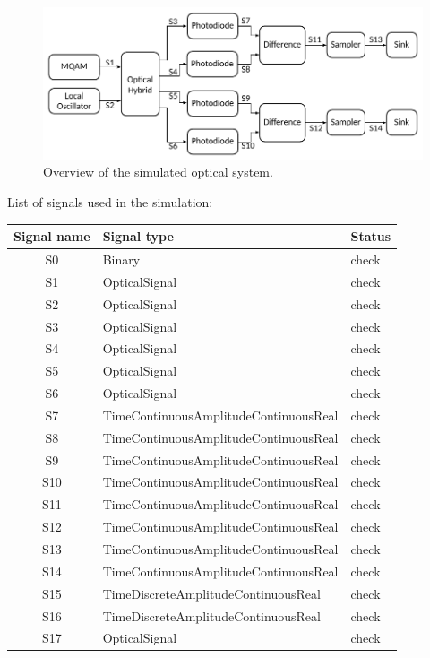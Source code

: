 \begin{figure}[H]
\centering
\includegraphics[width=\linewidth]{./sdf/quantum_noise/figures/scheme_setup.pdf}
\caption{Overview of the simulated optical system.}
\label{fig:setup}
\end{figure}
%
\vspace{1em}
%
List of signals used in the simulation:
\begin{table}[H]
\centering
\begin{tabular}{|c|l|l|}
\hline
\bf{Signal name}	& \bf{Signal type}						& \bf{Status}\\
\hline
S0					& Binary								& check\\
S1					& OpticalSignal							& check\\
S2					& OpticalSignal							& check\\
S3					& OpticalSignal							& check\\
S4					& OpticalSignal							& check\\
S5					& OpticalSignal							& check\\
S6					& OpticalSignal							& check\\
S7					& TimeContinuousAmplitudeContinuousReal	& check\\
S8					& TimeContinuousAmplitudeContinuousReal	& check\\
S9					& TimeContinuousAmplitudeContinuousReal	& check\\
S10					& TimeContinuousAmplitudeContinuousReal	& check\\
S11					& TimeContinuousAmplitudeContinuousReal	& check\\
S12					& TimeContinuousAmplitudeContinuousReal	& check\\
S13					& TimeContinuousAmplitudeContinuousReal	& check\\
S14					& TimeContinuousAmplitudeContinuousReal	& check\\
S15					& TimeDiscreteAmplitudeContinuousReal	& check\\
S16					& TimeDiscreteAmplitudeContinuousReal	& check\\
S17					& OpticalSignal							& check\\
\hline
\end{tabular}
\end{table}
